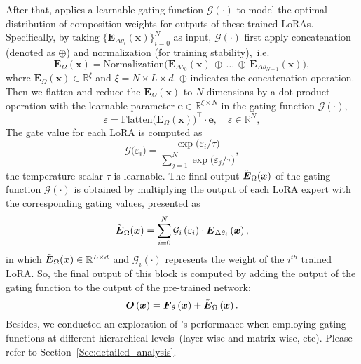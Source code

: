 After that, \our{} applies a learnable gating function $\mathcal{G}\left(\cdot\right)$ to model the optimal distribution of composition weights for outputs of these trained LoRAs.
Specifically, by taking $\{\boldsymbol{E}_{\Delta\theta_i}\left(\boldsymbol{x}\right)\}_{i=0}^{N}$ as input, $\mathcal{G}\left(\cdot\right)$ first apply concatenation (denoted as $\oplus$) and normalization (for training stability),~i.e.
\begin{equation}
    \boldsymbol{E}_{\Omega}\left(\boldsymbol{x}\right) =  \text{Normalization}\Big(\boldsymbol{E}_{\Delta\theta_0}\left(\boldsymbol{x}\right)\, \oplus \,\ldots\, \oplus \,\boldsymbol{E}_{\Delta\theta_{N-1}}\left(\boldsymbol{x}\right)\Big),
\end{equation}
where $\boldsymbol{E}_{\Omega}\left(\boldsymbol{x}\right) \in \mathbb{R}^{\xi}$ and $\xi = N\times L\times d$. $\oplus$ indicates the concatenation operation.
Then we flatten and reduce the $\boldsymbol{E}_{\Omega}\left(\boldsymbol{x}\right)$ to $N$-dimensions by a dot-product operation with the learnable parameter $\boldsymbol{e} \in \mathbb{R}^{\xi \times N}$ in the gating function $\mathcal{G}\left(\cdot\right)$, 
\begin{equation}
\varepsilon = \text{Flatten}\Big(\boldsymbol{E}_{\Omega}\left(\boldsymbol{x}\right)\Big)^{\top} \cdot \boldsymbol{e}, \quad \varepsilon \in \mathbb{R}^{N},
\end{equation}
The gate value for each LoRA is computed as
\begin{equation}
\label{EQ. temp}
\mathcal{G}\big(\varepsilon_i\big) = \frac{\exp\big(\varepsilon_i / \tau\big)}{\sum_{j=1}^{N} \exp\big(\varepsilon_j / \tau\big)},
\end{equation}
the temperature scalar $\tau$ is learnable.
The final output $\Tilde{\boldsymbol{E}}_{\Omega}(\boldsymbol{x})$ of the gating function $\mathcal{G}\left(\cdot\right)$ is obtained by multiplying the output of each LoRA expert with the corresponding gating values, presented as
\begin{equation}
\Tilde{\boldsymbol{E}}_{\Omega}(\boldsymbol{x}) = \sum_{i=0}^{N}\mathcal{G}_i\left(\varepsilon_i\right)\cdot\boldsymbol{E}_{\Delta\theta_i}\left(\boldsymbol{x}\right),
\end{equation}
in which $\Tilde{\boldsymbol{E}}_{\Omega}(\boldsymbol{x}) \in \mathbb{R}^{L\times d}$ and $\mathcal{G}_i\left(\cdot\right)$ represents the weight of the $i^{th}$ trained LoRA. So, the final output of this block is computed by adding the output of the gating function to the output of the pre-trained network:
\begin{equation}
\boldsymbol{O}\left(\boldsymbol{x}\right) = \boldsymbol{F}_{\theta}\left(\boldsymbol{x}\right) + \Tilde{\boldsymbol{E}}_{\Omega}\left(\boldsymbol{x}\right).
\end{equation}
Besides, we conducted an exploration of \our's performance when employing gating functions at different hierarchical levels~(layer-wise and matrix-wise, etc). Please refer to Section~\ref{Sec:detailed_analysis}.

